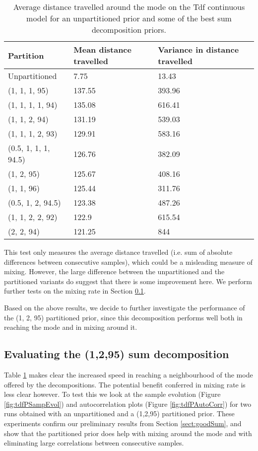 \begin{table}[h]
  \centering
  \begin{tabular}{lll}
    \toprule
    Partition & Mean distance travelled & Variance in distance travelled \\
    \midrule
    Unpartitioned & 7.75 & 13.43 \\
    (1, 1, 1, 95) & 137.55 & 393.96 \\
    (1, 1, 1, 1, 94) & 135.08 & 616.41 \\
    (1, 1, 2, 94) & 131.19 & 539.03 \\
    (1, 1, 1, 2, 93) & 129.91 & 583.16 \\
    (0.5, 1, 1, 1, 94.5) & 126.76 & 382.09 \\
    (1, 2, 95) & 125.67 & 408.16 \\
    (1, 1, 96) & 125.44 & 311.76 \\
    (0.5, 1, 2, 94.5) & 123.38 & 487.26 \\
    (1, 1, 2, 2, 92) & 122.9 & 615.54 \\
    (2, 2, 94) & 121.25 & 844 \\
    \bottomrule
  \end{tabular}
  \caption{Average distance travelled around the mode on the Tdf continuous model for an unpartitioned prior and some of the best sum decomposition priors.}
  \label{tab:bestParts}
\end{table}

This test only measures the average distance travelled (i.e. sum of absolute differences between consecutive samples), which could be a misleading measure of mixing. However, the large difference between the unpartitioned and the partitioned variants do suggest that there is some improvement here. We perform further tests on the mixing rate in Section \ref{sect:1295Eval}.

Based on the above results, we decide to further investigate the performance of the (1, 2, 95) partitioned prior, since this decomposition performs well both in reaching the mode and in mixing around it.

\subsection{Evaluating the (1,2,95) sum decomposition}
\label{sect:1295Eval}

Table \ref{tab:bestParts} makes clear the increased speed in reaching a neighbourhood of the mode offered by the decompositions. The potential benefit conferred in mixing rate is less clear however. To test this we look at the sample evolution (Figure \ref{fig:tdfPSampEvol}) and autocorrelation plots (Figure \ref{fig:tdfPAutoCorr}) for two runs obtained with an unpartitioned and a (1,2,95) partitioned prior. These experiments confirm our preliminary results from Section \ref{sect:goodSum}, and show that the partitioned prior does help with mixing around the mode and with eliminating large correlations between consecutive samples. 


